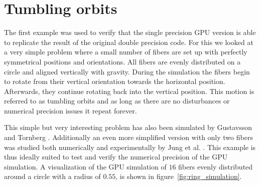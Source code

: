 \documentclass[a4paper,11pt]{kth-mag}
\begin{document}
\section{Tumbling orbits}
\label{sec:example_ring}

The first example was used to verify that the single precision GPU version is able to replicate the result of the original double precision code. For this we looked at a very simple problem where a small number of fibers are set up with perfectly symmetrical positions and orientations. All fibers are evenly distributed on a circle and aligned vertically with gravity. During the simulation the fibers begin to rotate from their vertical orientation towards the horizontal position. Afterwards, they continue rotating back into the vertical position. This motion is referred to as tumbling orbits and as long as there are no disturbances or numerical precision issues it repeat forever.

This simple but very interesting problem has also been simulated by Gustavsson and Tornberg \cite{Gustavsson2009}. Additionally an even more simplified version with only two fibers was studied both numerically and experimentally by Jung et al. \cite{Jung2006}. This example is thus ideally suited to test and verify the numerical precision of the GPU simulation. A visualization of the GPU simulation of $16$ fibers evenly distributed around a circle with a radius of $0.55$, is shown in figure~\ref{fig:ring_simulation}.
\end{document}
